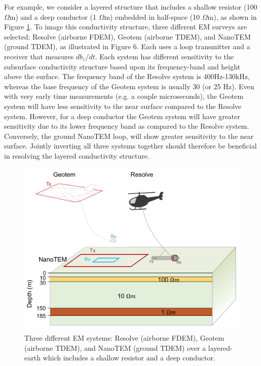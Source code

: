 \documentclass[paper]{geophysics}
\begin{document}
For example, we consider a layered structure that includes a shallow resistor (100 $\Omega$m) and a deep conductor (1 $\Omega$m) embedded in half-space (10 $\Omega$m), as shown in Figure \ref{fig:joint-setup}. To image this conductivity structure, three different EM surveys are selected: Resolve (airborne FDEM), Geotem (airborne TDEM), and NanoTEM (ground TDEM), as illustrated in Figure 6. Each uses a loop transmitter and a receiver that measures $db_z/dt$. Each system has different sensitivity to the subsurface conductivity structure based upon its frequency-band and height above the surface. The frequency band of the Resolve system is 400Hz-130kHz, whereas the base frequency of the Geotem system is usually 30 (or 25 Hz). Even with very early time measurements (e.g. a couple microseconds), the Geotem system will have less sensitivity to the near surface compared to the Resolve system. However, for a deep conductor the Geotem system will have greater sensitivity due to its lower frequency band as compared to the Resolve system. Conversely, the ground NanoTEM loop, will show greater sensitivity to the near surface. Jointly inverting all three systems together should therefore be beneficial in resolving the layered conductivity structure.



\begin{figure}
    \begin{center}
    \includegraphics[width=0.8\columnwidth]{figures/joint-setup.png}
    \end{center}
\caption{
    Three different EM systems: Resolve (airborne FDEM), Geotem (airborne TDEM), and NanoTEM (ground TDEM) over a layered-earth which includes a shallow resistor and a deep conductor.
}
\label{fig:joint-setup}
\end{figure}
\end{document}
